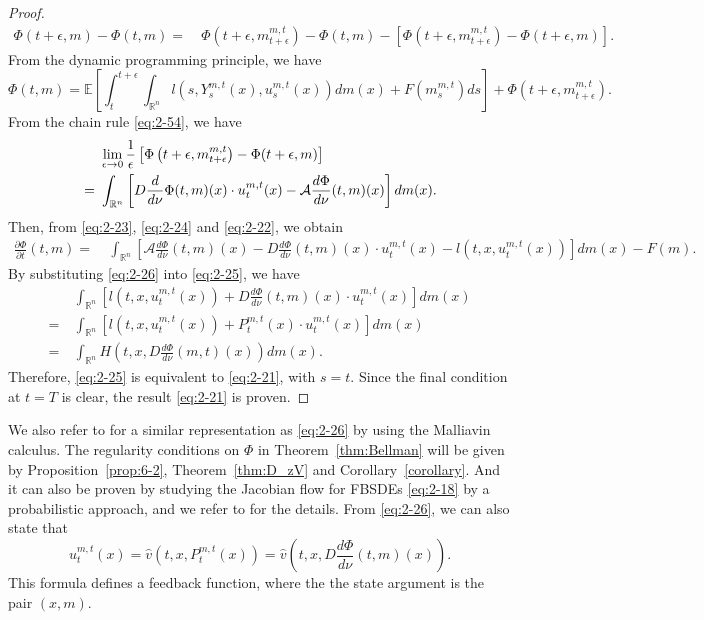 \documentclass[11pt]{article}
\numberwithin{equation}{section}
\newcommand{\e}{\mathbb{E}}
\newcommand{\brn}{{\mathbb{R}^n}}
\newcommand{\1}{\mbox{1\hspace{-1mm}I}}
\begin{document}
\begin{proof}
\begin{align}
    \Phi(t+\epsilon,m)-\Phi(t,m)=\ & \Phi\left(t+\epsilon,m^{m,t}_{t+\epsilon}\right)-\Phi(t,m) -\left[\Phi\left(t+\epsilon,m^{m,t}_{t+\epsilon}\right)-\Phi(t+\epsilon,m)\right]. \label{eq:2-23}
\end{align}
From the dynamic programming principle, we have 
\begin{equation}\label{eq:2-22}
    \Phi(t,m)=\e\left[\int_{t}^{t+\epsilon}\int_{\brn}l\left(s,Y^{m,t}_s(x),u^{m,t}_s(x)\right)dm(x)+F\left(m^{m,t}_s\right)ds\right]+\Phi\left(t+\epsilon, m^{m,t}_{t+\epsilon}\right). 
\end{equation}
From the chain rule \eqref{eq:2-54}, we have
\begin{align}
    &\lim_{\epsilon\to 0}\dfrac{1}{\epsilon}\left[\Phi\left(t+\epsilon,m^{m,t}_{t+\epsilon}\right)-\Phi(t+\epsilon,m)\right] \notag \\
    =\ & \int_{\brn}\left[D\dfrac{d}{d\nu}\Phi(t,m)(x)\cdot u^{m,t}_t(x)-\mathcal{A}\frac{d\Phi}{d\nu}(t,m)(x)\right]dm(x).\label{eq:2-24}
\end{align}
Then, from \eqref{eq:2-23}, \eqref{eq:2-24} and \eqref{eq:2-22}, we obtain
\begin{align}\label{eq:2-25}
    \frac{\partial \Phi}{\partial t}(t,m)=\ & \int_{\brn}\left[\mathcal{A}\frac{d\Phi}{d\nu}(t,m)(x)-D\frac{d\Phi}{d\nu}(t,m)(x)\cdot u^{m,t}_t(x)-l\left(t,x,u^{m,t}_t(x)\right)\right]dm(x)-F(m).
\end{align}
By substituting \eqref{eq:2-26} into \eqref{eq:2-25}, we have
\begin{align*}
    &\int_{\brn}\left[l\left(t,x,u^{m,t}_t(x)\right)+D\frac{d\Phi}{d\nu}(t,m)(x)\cdot u^{m,t}_t(x)\right]dm(x)\\
    =\ & \int_{\brn}\left[l\left(t,x,u^{m,t}_t(x)\right)+P^{m,t}_t(x)\cdot u^{m,t}_t(x)\right]dm(x)\\
    =\ & \int_{\brn}H\left(t,x,D\frac{d\Phi}{d\nu}(m,t)(x)\right)dm(x).
\end{align*}
Therefore, \eqref{eq:2-25} is equivalent to \eqref{eq:2-21}, with $s=t$. Since the final condition at $t=T$ is clear, the result \eqref{eq:2-21} is proven. 
\end{proof}

We also refer to \cite{Buckdahn-Peng} for a similar representation as \eqref{eq:2-26} by using the Malliavin calculus. The regularity conditions on $\Phi$ in Theorem~\ref{thm:Bellman} will be given by Proposition~\ref{prop:6-2}, Theorem~\ref{thm:D_zV} and Corollary~\ref{corollary}. And it can also be proven by studying the Jacobian flow for FBSDEs \eqref{eq:2-18} by a probabilistic approach, and we refer to \cite{AB10} for the details. From \eqref{eq:2-26}, we can also state that 
\begin{equation}\label{eq:2-30}
    u^{m,t}_t(x)=\widehat{v}\left(t,x,P^{m,t}_t(x)\right)= \widehat{v}\left(t,x,D\frac{d\Phi}{d\nu}(t,m)(x)\right).
\end{equation}
This formula defines a feedback function, where the the state argument is the pair $(x,m)$. 
\end{document}
